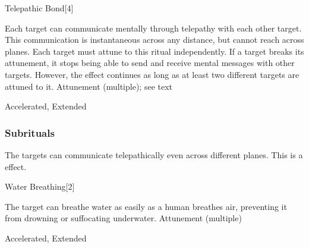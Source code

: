 \begin{spellsection}{Telepathic Bond}[4]
\begin{spellcontent}
\begin{spelltargetinginfo}
\end{spelltargetinginfo}
\begin{spelleffects}
\spelleffect
Each target can communicate mentally through telepathy with each other target.
This communication is instantaneous across any distance, but cannot reach across planes.
Each target must attune to this ritual independently.
If a target breaks its attunement, it stops being able to send and receive mental messages with other targets.
However, the effect continues as long as at least two different targets are attuned to it.
\spelldur Attunement (multiple); see text
\end{spelleffects}
\end{spellcontent}
\begin{spellfooter}
 Accelerated, Extended
\end{spellfooter}
\begin{spellsubcontent}
\end{spellsubcontent}
\end{spellsection}
\subsubsection{Subrituals}
The targets can communicate telepathically even across different planes.
This is a  effect.
\begin{spellsection}{Water Breathing}[2]
\begin{spellcontent}
\begin{spelltargetinginfo}
\end{spelltargetinginfo}
\begin{spelleffects}
\spelleffect
The target can breathe water as easily as a human breathes air, preventing it from drowning or suffocating underwater.
\spelldur Attunement (multiple)
\end{spelleffects}
\end{spellcontent}
\begin{spellfooter}
 Accelerated, Extended
\end{spellfooter}
\begin{spellsubcontent}
\end{spellsubcontent}
\end{spellsection}